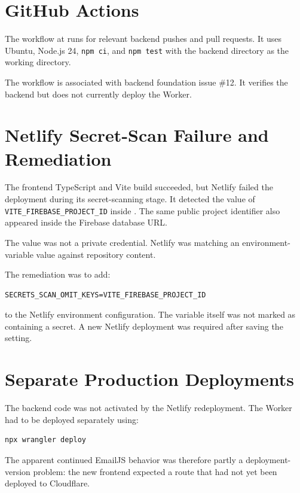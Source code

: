 \documentclass[11pt,a4paper,oneside]{report}
\begin{document}
\section{GitHub Actions}

The workflow at  runs for relevant backend pushes and pull requests. It uses Ubuntu, Node.js 24, \texttt{npm ci}, and \texttt{npm test} with the backend directory as the working directory.

The workflow is associated with backend foundation issue \#12. It verifies the backend but does not currently deploy the Worker.

\section{Netlify Secret-Scan Failure and Remediation}

The frontend TypeScript and Vite build succeeded, but Netlify failed the deployment during its secret-scanning stage. It detected the value of \texttt{VITE\_FIREBASE\_PROJECT\_ID} inside . The same public project identifier also appeared inside the Firebase database URL.

The value was not a private credential. Netlify was matching an environment-variable value against repository content.

The remediation was to add:

\begin{lstlisting}
SECRETS_SCAN_OMIT_KEYS=VITE_FIREBASE_PROJECT_ID
\end{lstlisting}

to the Netlify environment configuration. The variable itself was not marked as containing a secret. A new Netlify deployment was required after saving the setting.

\section{Separate Production Deployments}

The backend code was not activated by the Netlify redeployment. The Worker had to be deployed separately using:

\begin{lstlisting}
npx wrangler deploy
\end{lstlisting}

The apparent continued EmailJS behavior was therefore partly a deployment-version problem: the new frontend expected a route that had not yet been deployed to Cloudflare.
\end{document}
